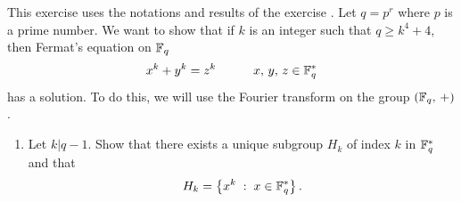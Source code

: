 
\begin{exo}
\label{exo-thm-fermat-finite-body}
 
  This exercise uses the notations and results of the exercise . Let $ q = p^r $ where $ p $ is a prime number. We want to show that if $ k $ is an integer such that $ q \geq k^4 + 4 $, then Fermat's equation on $ \mathbb{F}_q $
\begin{equation}
\label{eq-thm-fermat-finite-body}
x^k + y^k = z^k \quad \quad \quad x, \, y, \, z \in \mathbb{F}_q^*
\end{equation}
has a solution. To do this, we will use the Fourier transform on the group $ (\mathbb{F}_q, \, +) $. \begin{enumerate}
\item {} Let $ k | q-1 $. Show that there exists a unique subgroup $ H_k $ of index $ k $ in $ \mathbb{F}_q^* $ and that
\begin{equation*}
H_k = \left\{ x^k \;:\; x \in \mathbb{F}_q^* \right\}.
\end{equation*}
 

\end{enumerate}
\end{exo}
